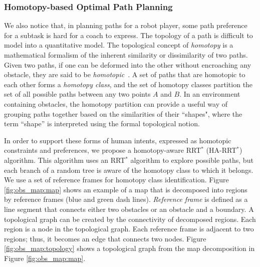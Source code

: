 \documentclass[phd]{byuprop}
\begin{document}
\subsubsection{Homotopy-based Optimal Path Planning}
\label{sec:project_description:homotopy_based_path_planning}

We also notice that, in planning paths for a robot player, some path preference for a subtask is hard for a coach to express.
The topology of a path is difficult to model into a quantitative model.
The topological concept of \emph{homotopy} is a mathematical formalism of the inherent similarity or dissimilarity of two paths.
Given two paths, if one can be deformed into the other without encroaching any obstacle, they are said to be \emph{homotopic}~\cite{Hernandez2015}.
A set of paths that are homotopic to each other forms a \emph{homotopy class}, and the  set of homotopy classes partition the set of all possible paths between any two points $A$ and $B$.
In an environment containing obstacles, the homotopy partition can provide a useful way of grouping paths together based on the similarities of their ``shapes", where the term ``shape'' is interpreted using the formal topological notion.

In order to support these forms of human intents, expressed as homotopic constraints and preferences, we propose a homotopy-aware RRT$^{*}$ (HA-RRT$^{*}$) algorithm. 
This algorithm uses an RRT$^*$ algorithm to explore possible paths, but each branch of a random tree is aware of the homotopy class to which it belongs. 
We use a set of reference frames for homotopy class identification.
Figure \ref{fig:obs_map:map} shows an example of a map that is decomposed into regions by reference frames (blue and green dash lines).
\emph{Reference frame} is defined as a line segment that connects either two obstacles or an obstacle and a boundary.
A topological graph can be created by the connectivity of decomposed regions.
Each region is a node in the topological graph.
Each reference frame is adjacent to two regions; thus, it becomes an edge that connects two nodes.
Figure \ref{fig:obs_map:topology} shows a topological graph from the map decomposition in Figure \ref{fig:obs_map:map}.
\end{document}
